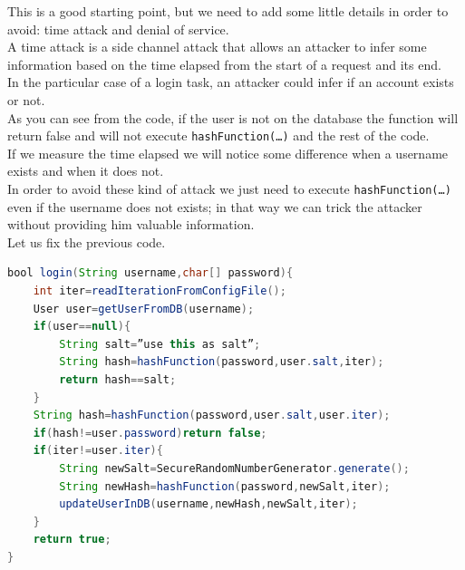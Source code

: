 This is a good starting point, but we need to add some little details in order to avoid: time attack and denial of service.\\
A time attack is a side channel attack that allows an attacker to infer some information based on the time elapsed from the start of a request and its end.\\
In the particular case of a login task, an attacker could infer if an account exists or not.\\
As you can see from the code, if the user is not on the database the function will return false and will not execute \texttt{hashFunction(…)} and the rest of the code.\\
If we measure the time elapsed we will notice some difference when a username exists and when it does not.\\
In order to avoid these kind of attack we just need to execute \texttt{hashFunction(…)} even if the username does not exists; in that way we can trick the attacker without providing him valuable information.\\
Let us fix the previous code.\\
\begin{lstlisting}[language=Java]
bool login(String username,char[] password){
	int iter=readIterationFromConfigFile();
	User user=getUserFromDB(username);
	if(user==null){
		String salt=”use this as salt”;
		String hash=hashFunction(password,user.salt,iter);
		return hash==salt;
	}
	String hash=hashFunction(password,user.salt,user.iter);
	if(hash!=user.password)return false;
	if(iter!=user.iter){
		String newSalt=SecureRandomNumberGenerator.generate();
		String newHash=hashFunction(password,newSalt,iter);
		updateUserInDB(username,newHash,newSalt,iter);
	}
	return true;
}
\end{lstlisting}

